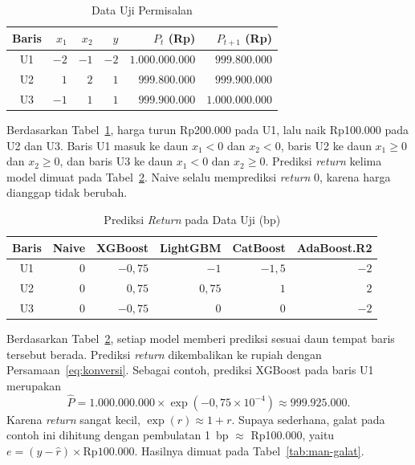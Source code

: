 \begin{table}[htbp]
  \caption{Data Uji Permisalan}
  \label{tab:man-uji}
  \centering
  \begingroup
  \footnotesize
  \setlength{\tabcolsep}{6pt}
  \begin{tabular}{|c|r|r|r|r|r|}
    \hline
    \textbf{Baris} & \textbf{$x_1$} & \textbf{$x_2$} & \textbf{$y$} & \textbf{$P_t$ (Rp)} & \textbf{$P_{t+1}$ (Rp)} \\
    \hline
    U1 & $-2$ & $-1$ & $-2$ & $1.000.000.000$ & $999.800.000$ \\
    U2 & $1$ & $2$ & $1$ & $999.800.000$ & $999.900.000$ \\
    U3 & $-1$ & $1$ & $1$ & $999.900.000$ & $1.000.000.000$ \\
    \hline
  \end{tabular}
  \endgroup
\end{table}

Berdasarkan Tabel~\ref{tab:man-uji}, harga turun Rp200.000 pada U1, lalu naik
Rp100.000 pada U2 dan U3. Baris U1 masuk ke daun $x_1 < 0$ dan $x_2 < 0$,
baris U2 ke daun $x_1 \ge 0$ dan $x_2 \ge 0$, dan baris U3 ke daun $x_1 < 0$
dan $x_2 \ge 0$. Prediksi \textit{return} kelima model dimuat pada
Tabel~\ref{tab:man-pred}. Naive selalu memprediksi \textit{return} 0, karena
harga dianggap tidak berubah.

\begin{table}[htbp]
  \caption{Prediksi \textit{Return} pada Data Uji (bp)}
  \label{tab:man-pred}
  \centering
  \begingroup
  \footnotesize
  \setlength{\tabcolsep}{4pt}
  \begin{tabular}{|c|r|r|r|r|r|}
    \hline
    \textbf{Baris} & \textbf{Naive} & \textbf{XGBoost} & \textbf{LightGBM} & \textbf{CatBoost} & \textbf{AdaBoost.R2} \\
    \hline
    U1 & $0$ & $-0{,}75$ & $-1$ & $-1{,}5$ & $-2$ \\
    U2 & $0$ & $0{,}75$ & $0{,}75$ & $1$ & $2$ \\
    U3 & $0$ & $-0{,}75$ & $0$ & $0$ & $-2$ \\
    \hline
  \end{tabular}
  \endgroup
\end{table}

Berdasarkan Tabel~\ref{tab:man-pred}, setiap model memberi prediksi sesuai
daun tempat baris tersebut berada. Prediksi \textit{return} dikembalikan ke rupiah dengan
Persamaan~\eqref{eq:konversi}. Sebagai contoh, prediksi XGBoost pada baris U1
merupakan
\begin{equation*}
  \hat{P} = 1.000.000.000 \times \exp\!\left(-0{,}75 \times 10^{-4}\right)
  \approx 999.925.000 .
\end{equation*}
Karena \textit{return} sangat kecil, $\exp(r) \approx 1 + r$. Supaya
sederhana, galat pada contoh ini dihitung dengan pembulatan 1~bp
$\approx$ Rp100.000, yaitu $e = (y - \hat{r}) \times \text{Rp}100.000$.
Hasilnya dimuat pada Tabel~\ref{tab:man-galat}.

